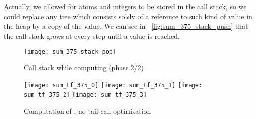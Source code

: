 Actually, we allowed for atoms and integers to be stored in the call
stack, so we could replace any tree which consists solely of a
reference to such kind of value in the heap by a copy of the value.
We can see in \fig~\vref{fig:sum_375_stack_push} that the call stack
grows at every step until a value is reached.
\begin{figure}[b]
\centering
\texttt{[image: sum\_375\_stack\_pop]}
\caption{Call stack while computing  (phase 2/2)
\label{fig:sum_375_stack_pop}}
\end{figure}

\begin{figure}
\centering
\texttt{[image: sum\_tf\_375\_0]}
\texttt{[image: sum\_tf\_375\_1]}
\texttt{[image: sum\_tf\_375\_2]}
\texttt{[image: sum\_tf\_375\_3]}
\caption{Computation of ,
no tail\hyp{}call optimisation\label{fig:sum_tf_375}}
\end{figure}

